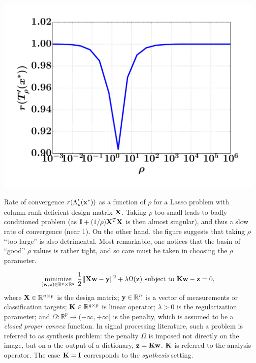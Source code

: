\begin{marginfigure}[4cm]
  \label{fig:rates}  
  \includegraphics[width=1\linewidth]{figures/lasso_rates.pdf}%
\caption{Rate of convergence $r(\Lambda'_\rho(\mathbf{x}^*))$ as a function of $\rho$
  for a Lasso problem with column-rank deficient design
  matrix $\mathbf{X}$. Taking $\rho$ too small leads
  to badly conditioned problem (as  $\mathbf{I} + (1/\rho)\mathbf{X}^T\mathbf{X}$ is then almost
  singular), and thus a slow rate of convergence (near 1). On the
  other hand, the figure suggests that taking $\rho$ ``too large''
  is also detrimental. Most remarkable, one notices that the basin of
  ``good'' $\rho$ values is rather tight, and so care must be taken in
  choosing the $\rho$ parameter.
}
\end{marginfigure} %

\begin{equation}
  \underset{(\mathbf{w},\mathbf{z}) \in \mathbb{R}^p \times
    \mathbb{R}^q}{\text{minimize}}\text{ }\frac{1}{2}\|\mathbf{X}\mathbf{w}-\mathbf{y}\|^2 +
  \lambda\Omega(\mathbf{z}) \text{ subject to }\mathbf{K}\mathbf{w}
    - \mathbf{z} = 0,
  \label{eq:main_pb}
\end{equation}
where $\mathbf{X} \in \mathbb{R}^{n \times  p}$ is the design matrix; $\mathbf{y} \in
\mathbb{R}^n$ is a vector of measurements or classification targets; 
$\mathbf{K}\in\mathbb{R}^{q \times p}$ is linear operator;  $\lambda > 0$ is the
regularization parameter;
and $\Omega: \mathbb{R}^p \rightarrow (-\infty, +\infty]$ is
    the penalty, which is assumed to be a \textit{closed proper
      convex} function.
    In signal processing literature, such a problem is referred to as synthesis problem: the penalty $\Omega$ is imposed not directly on the image, but on a the output of a dictionary, $\mathbf{z} = \mathbf{K}\mathbf{w}$. $\mathbf{K}$ is referred to the analysis operator. The case $\mathbf{K} = \mathbf{I}$ corresponds to the \textit{synthesis} setting.
    
